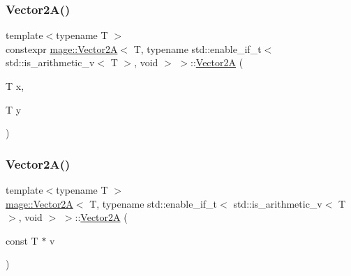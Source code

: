 \subsubsection{\texorpdfstring{Vector2\+A()}{Vector2A()}\hspace{0.1cm}{\footnotesize\ttfamily [2/7]}}
{\footnotesize\ttfamily template$<$typename T $>$ \\
constexpr \hyperlink{structmage_1_1_vector2_a}{mage\+::\+Vector2A}$<$ T, typename std\+::enable\+\_\+if\+\_\+t$<$ std\+::is\+\_\+arithmetic\+\_\+v$<$ T $>$, void $>$ $>$\+::\hyperlink{structmage_1_1_vector2_a}{Vector2A} (\begin{DoxyParamCaption}\item[{T}]{x,  }\item[{T}]{y }\end{DoxyParamCaption})\hspace{0.3cm}{\ttfamily [noexcept]}}

\hypertarget{structmage_1_1_vector2_a_3_01_t_00_01typename_01std_1_1enable__if__t_3_01std_1_1is__arithmetic__b421e7a25afc1ac5972d3b452777021a_a04d3fa414db780d57cb6ff066a32b6f9}{}\label{structmage_1_1_vector2_a_3_01_t_00_01typename_01std_1_1enable__if__t_3_01std_1_1is__arithmetic__b421e7a25afc1ac5972d3b452777021a_a04d3fa414db780d57cb6ff066a32b6f9} 
\subsubsection{\texorpdfstring{Vector2\+A()}{Vector2A()}\hspace{0.1cm}{\footnotesize\ttfamily [3/7]}}
{\footnotesize\ttfamily template$<$typename T $>$ \\
\hyperlink{structmage_1_1_vector2_a}{mage\+::\+Vector2A}$<$ T, typename std\+::enable\+\_\+if\+\_\+t$<$ std\+::is\+\_\+arithmetic\+\_\+v$<$ T $>$, void $>$ $>$\+::\hyperlink{structmage_1_1_vector2_a}{Vector2A} (\begin{DoxyParamCaption}\item[{const T $\ast$}]{v }\end{DoxyParamCaption})\hspace{0.3cm}{\ttfamily [noexcept]}}

